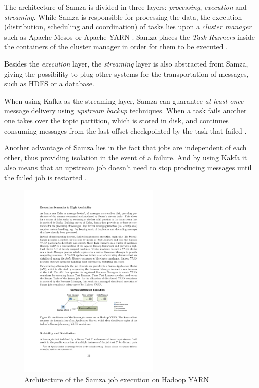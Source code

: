 \documentclass[ppgc,diss,english]{iiufrgs}
\begin{document}
The architecture of Samza is divided in three layers: \emph{processing}, \emph{execution} and \emph{streaming}. While Samza is responsible for processing the data, the execution (distribution, scheduling and coordination) of tasks lies upon a \emph{cluster manager} such as Apache Mesos or Apache YARN \cite{ramesh2015samza}. Samza places the \emph{Task Runners} inside the containers of the cluster manager in order for them to be executed \cite{bockermann2014survey}.

Besides the \emph{execution} layer, the \emph{streaming} layer is also abstracted from Samza, giving the possibility to plug other systems for the transportation of messages, such as HDFS or a database.

When using Kafka as the streaming layer, Samza can guarantee \emph{at-least-once} message delivery using \emph{upstream backup} techniques. When a task fails another one takes over the topic partition, which is stored in disk, and continues consuming messages from the last offset checkpointed by the task that failed \cite{kamburugamuvesurvey}.

Another advantage of Samza lies in the fact that jobs are independent of each other, thus providing isolation in the event of a failure. And by using Kakfa it also means that an upstream job doesn't need to stop producing messages until the failed job is restarted \cite{ramesh2015samza}.

\begin{figure}[!ht]
	\centering
	\includegraphics[width=0.6\textwidth]{images/samza/architecture.pdf}
	\caption[Architecture of the Samza job execution on Hadoop YARN]{Architecture of the Samza job execution on Hadoop YARN \cite{bockermann2014survey}}
	\label{fig:samza_architecture}
\end{figure}
\end{document}
